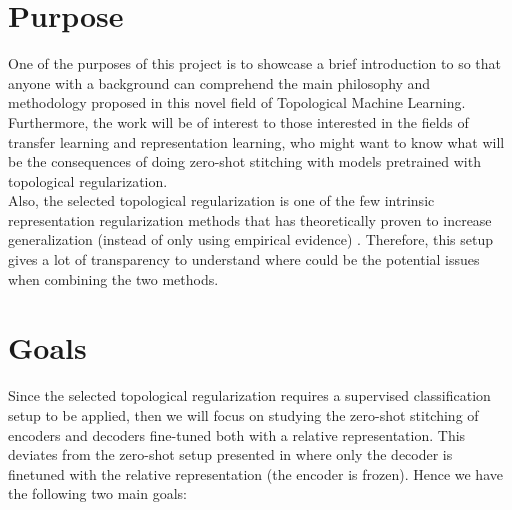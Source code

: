 \documentclass[../main.tex]{subfiles}
\begin{document}
\section{Purpose}

One of the purposes of this project is to showcase a brief introduction to  so that anyone with a  background can comprehend the main philosophy and methodology proposed in this novel field of Topological Machine Learning. Furthermore, the work will be of interest to those interested in the fields of transfer learning and representation learning, who might want to know what will be the consequences of doing zero-shot stitching with models pretrained with topological regularization.\\

Also, the selected topological regularization is one of the few intrinsic representation regularization methods that has theoretically proven to increase generalization (instead of only using empirical evidence) \cite{hofer_densified_2021}. Therefore, this setup gives a lot of transparency to understand where could be the potential issues when combining the two methods.


\section{Goals}



Since the selected topological regularization \cite{hofer_densified_2021} requires a supervised classification setup to be applied, then we will focus on studying the zero-shot stitching of encoders and decoders fine-tuned both with a relative representation. This deviates from the zero-shot setup presented in \cite{moschella_relative_2022} where only the decoder is finetuned with the relative representation (the encoder is frozen). Hence we have the following two main goals:
\end{document}
